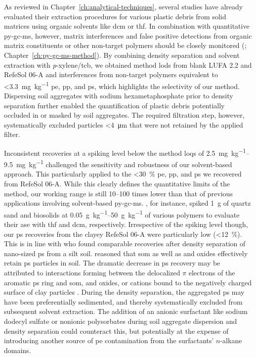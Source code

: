 As reviewed in Chapter~\ref{ch:analytical-techniques}, several studies have already evaluated their extraction procedures for various plastic debris from solid matrices using organic solvents like \ac{dcm} or \ac{thf}. In combination with quantitative \ac{py-gc-ms}, however, matrix interferences and false positive detections from organic matrix constituents or other non-target polymers should be closely monitored (\citealp{DierkesQuantification2019}; Chapter~\ref{ch:py-gc-ms-method}).
By combining density separation and solvent extraction with \textit{p}-xylene/\ac{tcb}, we obtained method \acp{lod} from blank LUFA 2.2 and RefeSol 06-A and interferences from non-target polymers equivalent to 
\SI{<3.3}{\milli\gram\per\kilo\gram} \ac{pe}, \ac{pp}, and \ac{ps}, which highlights the selectivity of our method. Dispersing soil aggregates with sodium hexametaphosphate prior to density separation further enabled the quantification of plastic debris potentially occluded in or masked by soil aggregates. The required filtration step, however, systematically excluded particles \SI{<4}{\micro\meter} that were not retained by the applied filter.

Inconsistent recoveries at a spiking level below the method \acp{loq} of \SIrange[range-phrase={ to }]{2.5}{9.5}{\milli\gram\per\kilo\gram} challenged the sensitivity and robustness of our solvent-based approach. This particularly applied to the \SI{<30}{\percent} \ac{pe}, \ac{pp}, and \ac{ps} we recovered from RefeSol 06-A. While this clearly defines the quantitative limits of the method, our working range is still \numrange{10}{100} times lower than that of previous applications involving solvent-based \ac{py-gc-ms}. , for instance, spiked \SI{1}{\gram} of quartz sand and biosolids at \SIrange{0.05}{50}{\gram\per\kilo\gram} of various polymers to evaluate their \ac{ase} with \ac{thf} and \ac{dcm}, respectively.
Irrespective of the spiking level though, our \ac{ps} recoveries from the clayey RefeSol 06-A were particularly low (\SI{<12}{\percent}). This is in line with \citet{WangPoor2018} who found comparable recoveries after density separation of nano-sized \ac{ps} from a silt soil. \citet{LuoDistribution2020,WuTransport2020} reasoned that \ac{som} as well as  and  oxides effectively retain \ac{ps} particles in soil. The dramatic decrease in \ac{ps} recovery may be attributed to interactions forming between the delocalized $\pi$ electrons of the aromatic \ac{ps} ring and \ac{som},  and  oxides, or cations bound to the negatively charged surface of clay particles \citep{NewcombDeveloping2017}. During the density separation, the aggregated \ac{ps} may have been preferentially sedimented, and thereby systematically excluded from subsequent solvent extraction. The addition of an anionic surfactant like sodium dodecyl sulfate or nonionic polysorbates during soil aggregate dispersion and density separation could counteract this, but potentially at the expense of introducing another source of \ac{pe} contamination from the surfactants' $n$-alkane domains.

